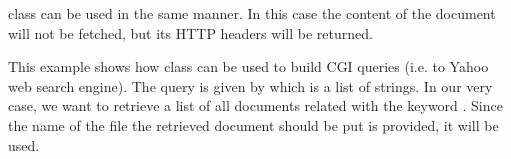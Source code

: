 \documentclass{ozdoc}
\begin{document}
\begin{mozartCODEDISPLAY}
{\mozartSPACE{}\mozartSPACE{}\mozartSPACE{}}\mozartFACETEXT{\mozartNEWLINE
\mozartSPACE{}\mozartSPACE{}\mozartSPACE{}\mozartSPACE{}\mozartSPACE{}\mozartSPACE{}}\mozartFACETEXT{\mozartNEWLINE
\mozartSPACE{}\mozartSPACE{}\mozartSPACE{}\mozartSPACE{}\mozartSPACE{}\mozartSPACE{}}\mozartFACETEXT{\mozartNEWLINE
\mozartSPACE{}\mozartSPACE{}\mozartSPACE{}}\mozartFACETEXT{\mozartNEWLINE
}\end{mozartCODEDISPLAY}


 class can be used in the same manner. In this case the content of the document will not be fetched, but its HTTP headers will be returned.  \mozartEMPTY





This example shows how  class can be used to build CGI queries (i.e. to Yahoo web search engine). The query is given by  which is a list of  strings. In our very case, we want to retrieve a list of all documents related with the keyword . Since the name of the file the retrieved document should be put is provided, it will be used. 
\end{document}
